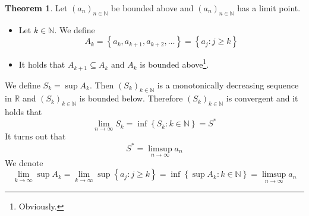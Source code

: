 \documentclass[a4paper,landscape,twocolumn]{article}
\theoremstyle{definition}
\newtheorem{theorem}{Theorem}
\newcommand\set[1]{\left\{#1\right\}}
\newcommand\seq[1]{{\left(#1\right)}_{n \in \mathbb N}}
\begin{document}
\begin{theorem}
  Let $\seq{a_n}$ be bounded above and $\seq{a_n}$ has a limit point.
  \begin{itemize}
    \item Let $k \in \mathbb N$. We define
      \[ A_k = \set{a_k, a_{k+1}, a_{k+2}, \dots} = \set{a_j: j \geq k} \]
    \item It holds that $A_{k+1} \subseteq A_k$ and $A_k$ is bounded above\footnote{Obviously.}.
  \end{itemize}
  We define $S_k = \sup{A_k}$. Then $\left(S_k\right)_{k\in\mathbb N}$ is a monotonically decreasing
  sequence in $\mathbb R$ and $\left(S_k\right)_{k\in\mathbb N}$ is bounded below.
  Therefore $\left(S_k\right)_{k\in\mathbb N}$ is convergent and it holds that
  \[ \lim_{n\to\infty} S_k = \inf\set{S_k: k \in \mathbb N} = S^* \]
  It turns out that
  \[ S^* = \limsup_{n\to\infty} a_n \]
  We denote
  \[
      \lim_{k\to\infty} \sup{A_k}
      = \lim_{k\to\infty} \sup \set{a_j: j \geq k}
      = \inf\set{\sup{A_k}: k \in \mathbb N}
      = \limsup_{n\to\infty} a_n
  \]
\end{theorem}
\end{document}
